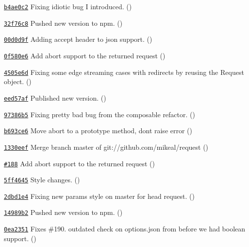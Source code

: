 \begin{DoxyItemize}
\item \href{https://github.com/mikeal/request/commit/b4ae0c2d50f018a90a3ec8daa1d14c92a99873b9}{\tt b4ae0c2} Fixing idiotic bug I introduced. ()
\item \href{https://github.com/mikeal/request/commit/32f76c8baaf784dc2f4f1871153b1796bcebdcfe}{\tt 32f76c8} Pushed new version to npm. ()
\item \href{https://github.com/mikeal/request/commit/00d0d9f432182f13a5b8aa2e3a2a144b5c179015}{\tt 00d0d9f} Adding accept header to json support. ()
\item \href{https://github.com/mikeal/request/commit/0f580e6f6317c5301a52c0b6963d58e27112abca}{\tt 0f580e6} Add abort support to the returned request ()
\item \href{https://github.com/mikeal/request/commit/4505e6d39a44229bfe5dc4d9a920233e05a7dfdb}{\tt 4505e6d} Fixing some edge streaming cases with redirects by reusing the Request object. ()
\item \href{https://github.com/mikeal/request/commit/eed57af8fe3e16632e9e0043d4d7f4d147dbfb8f}{\tt eed57af} Published new version. ()
\item \href{https://github.com/mikeal/request/commit/97386b5d7315b5c83702ffc7d0b09e34ecb67e04}{\tt 97386b5} Fixing pretty bad bug from the composable refactor. ()
\item \href{https://github.com/mikeal/request/commit/b693ce64e16aaa859d4edc86f82fbb11e00d33c0}{\tt b693ce6} Move abort to a prototype method, don\textquotesingle{}t raise error ()
\item \href{https://github.com/mikeal/request/commit/1330eef3ec84a651a435c95cf1ff1a4003086440}{\tt 1330eef} Merge branch \textquotesingle{}master\textquotesingle{} of git\+://github.com/mikeal/request ()
\item \href{https://github.com/mikeal/request/pull/188}{\tt \#188} Add abort support to the returned request ()
\item \href{https://github.com/mikeal/request/commit/5ff46453e713da1ae66a0d510eda4919e4080abe}{\tt 5ff4645} Style changes. ()
\item \href{https://github.com/mikeal/request/commit/2dbd1e4350c2941b795b0e5ee7c0a00cd04cce09}{\tt 2dbd1e4} Fixing new params style on master for head request. ()
\item \href{https://github.com/mikeal/request/commit/14989b2dfc6830dbdad5364930fba1d2995aba06}{\tt 14989b2} Pushed new version to npm. ()
\item \href{https://github.com/mikeal/request/commit/0ea2351ef017ada9b8472f8d73086715ebe30c6a}{\tt 0ea2351} Fixes \#190. outdated check on options.\+json from before we had boolean support. ()

\end{DoxyItemize}
